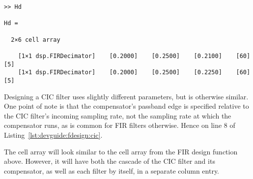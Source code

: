\begin{tcolorbox}[
    skin=alpenlisting,
    title={
        \refstepcounter{listing}
        \textbf{Listing \thelisting:} Cell Array with Two FIR Filters
        \label{lst:devguide:fdesign:fir_cell}
        \addcontentsline{lol}{listing}{\protect\numberline{\thelisting}Cell Array with Two FIR Filters}
    }
]
\begin{verbatim}
>> Hd

Hd =

  2×6 cell array

    [1×1 dsp.FIRDecimator]    [0.2000]    [0.2500]    [0.2100]    [60]    [5]
    [1×1 dsp.FIRDecimator]    [0.2000]    [0.2500]    [0.2250]    [60]    [5]
\end{verbatim}
\end{tcolorbox}

Designing  a   CIC  filter   uses  slightly   different  parameters,   but  is
otherwise  similar. One  point of  note  is  that the  compensator's  passband
edge  is  specified relative  to  the  CIC  filter's incoming  sampling  rate,
not  the  sampling rate  at  which  the compensator  runs,  as  is common  for
FIR  filters  otherwise. Hence    on  line  \num{8}  of
Listing~\ref{lst:devguide:fdesign:cic}.

The  cell array will look similar  to the cell array from the FIR
design  function above. However,  it will  have both  the cascade  of the  CIC
filter and its  compensator, as well as  each filter by itself,  in a separate
column entry.


